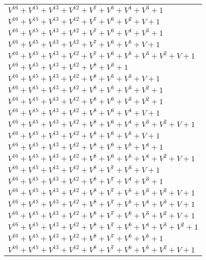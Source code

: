 \documentclass[12pt]{article}
\begin{document}
\begin{adjustwidth}{-4cm}{}
\begin{center}
\begin{longtable}{|l|}
$V^{16}  +V^{15}  +V^{13}  +V^{12}  +V^{7}  +V^{5}  +V^{4}  +V^{3}  + 1$ \\
$V^{16}  +V^{15}  +V^{13}  +V^{12}  +V^{7}  +V^{6}  +V^{2}  + V + 1$ \\
$V^{16}  +V^{15}  +V^{13}  +V^{12}  +V^{7}  +V^{6}  +V^{4}  +V^{3}  + 1$ \\
$V^{16}  +V^{15}  +V^{13}  +V^{12}  +V^{7}  +V^{6}  +V^{5}  + V + 1$ \\
$V^{16}  +V^{15}  +V^{13}  +V^{12}  +V^{7}  +V^{6}  +V^{5}  +V^{3}  +V^{2}  + V + 1$ \\
$V^{16}  +V^{15}  +V^{13}  +V^{12}  +V^{8}  +V^{3}  + 1$ \\
$V^{16}  +V^{15}  +V^{13}  +V^{12}  +V^{8}  +V^{5}  +V^{3}  + V + 1$ \\
$V^{16}  +V^{15}  +V^{13}  +V^{12}  +V^{8}  +V^{5}  +V^{3}  +V^{2}  + 1$ \\
$V^{16}  +V^{15}  +V^{13}  +V^{12}  +V^{8}  +V^{6}  +V^{3}  +V^{2}  + 1$ \\
$V^{16}  +V^{15}  +V^{13}  +V^{12}  +V^{8}  +V^{6}  +V^{4}  + V + 1$ \\
$V^{16}  +V^{15}  +V^{13}  +V^{12}  +V^{8}  +V^{6}  +V^{4}  +V^{3}  +V^{2}  + V + 1$ \\
$V^{16}  +V^{15}  +V^{13}  +V^{12}  +V^{8}  +V^{6}  +V^{5}  + V + 1$ \\
$V^{16}  +V^{15}  +V^{13}  +V^{12}  +V^{8}  +V^{6}  +V^{5}  +V^{4}  + 1$ \\
$V^{16}  +V^{15}  +V^{13}  +V^{12}  +V^{8}  +V^{6}  +V^{5}  +V^{4}  +V^{2}  + V + 1$ \\
$V^{16}  +V^{15}  +V^{13}  +V^{12}  +V^{8}  +V^{7}  +V^{3}  + V + 1$ \\
$V^{16}  +V^{15}  +V^{13}  +V^{12}  +V^{8}  +V^{7}  +V^{4}  +V^{3}  + 1$ \\
$V^{16}  +V^{15}  +V^{13}  +V^{12}  +V^{8}  +V^{7}  +V^{5}  +V^{3}  +V^{2}  + V + 1$ \\
$V^{16}  +V^{15}  +V^{13}  +V^{12}  +V^{8}  +V^{7}  +V^{5}  +V^{4}  +V^{3}  + V + 1$ \\
$V^{16}  +V^{15}  +V^{13}  +V^{12}  +V^{8}  +V^{7}  +V^{6}  +V^{3}  +V^{2}  + V + 1$ \\
$V^{16}  +V^{15}  +V^{13}  +V^{12}  +V^{8}  +V^{7}  +V^{6}  +V^{4}  +V^{3}  +V^{2}  + 1$ \\
$V^{16}  +V^{15}  +V^{13}  +V^{12}  +V^{8}  +V^{7}  +V^{6}  +V^{5}  + 1$ \\
$V^{16}  +V^{15}  +V^{13}  +V^{12}  +V^{8}  +V^{7}  +V^{6}  +V^{5}  +V^{2}  + V + 1$ \\

\end{longtable}
\end{center}
\end{adjustwidth}
\end{document}
